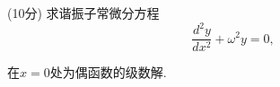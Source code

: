 \documentclass{njustexam}
\begin{document}
 




\begin{problem}{(10分)}
求谐振子常微分方程$$\frac{d^2y}{d x^2 } + \omega^2 y = 0,$$
\end{problem}
在$x=0$处为偶函数的级数解.
\smallskip
\end{document}
